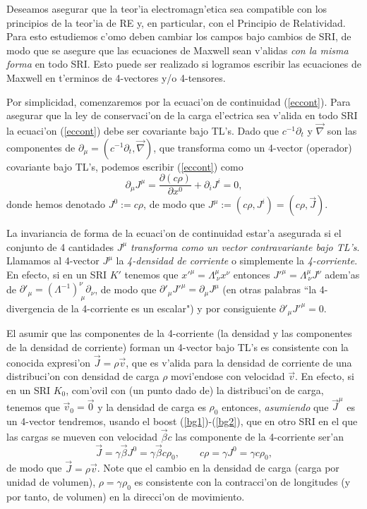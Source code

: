 Deseamos asegurar que la teor'ia electromagn'etica sea compatible con los
principios de la teor'ia de RE y, en particular, con el Principio de Relatividad. Para esto estudiemos c'omo deben cambiar los campos bajo cambios de SRI, de modo que se asegure que las ecuaciones de Maxwell sean v'alidas \textit{con la misma forma} en todo SRI. Esto puede ser realizado si logramos escribir las ecuaciones de Maxwell en t'erminos de 4-vectores y/o 4-tensores.

Por simplicidad, comenzaremos por la ecuaci'on de continuidad (\ref{eccont}). Para asegurar que la ley de conservaci'on de la carga el'ectrica sea v'alida en todo SRI la
ecuaci'on (\ref{eccont}) debe ser covariante bajo TL's.  Dado que
$c^{-1}\partial_t$ y $\vec{\nabla}$ son las componentes de
$\partial_\mu=(c^{-1}\partial_t, \vec\nabla)$, que transforma
como un 4-vector (operador) covariante bajo TL's, podemos escribir
(\ref{eccont}) como
\begin{equation}
\partial_\mu J^\mu=\frac{\partial(c \rho)}{\partial x^0} + \partial_i J^i =0
,\label{dj0}
\end{equation}
donde hemos denotado $J^0:=c \rho $, 
de modo que $J^\mu :=(c \rho,J^i)=(c \rho,\vec{J})$.

La invariancia de forma de la ecuaci'on de continuidad estar'a asegurada si el conjunto de 4 cantidades $J^\mu$ \textit{transforma como un vector contravariante bajo TL's}. Llamamos al 4-vector $J^\mu$ la \textit{4-densidad de corriente} o simplemente la \textit{4-corriente}. En efecto, si en un SRI $K'$ tenemos que $x'^\mu=\Lambda^\mu_{\ \nu}x^\nu$ entonces $J'^\mu=\Lambda^\mu_{\ \nu}J^\nu$ adem'as de $\partial'_\mu=(\Lambda^{-1})^\nu_{\  \mu}\partial_\nu$, de modo que $\partial'_\mu J'^\mu=\partial_\mu J^\mu$ (en otras palabras ``la 4-divergencia de la 4-corriente es un escalar") y por consiguiente $\partial'_\mu J'^\mu=0$.

El asumir que las componentes de la 4-corriente (la densidad y las componentes de la densidad de corriente) forman un 4-vector bajo TL's es consistente con la conocida expresi'on $\vec{J}=\rho\vec{v}$, que es v'alida para la densidad de corriente de una
distribuci'on con densidad de carga $\rho$ movi'endose con velocidad $\vec{v}$.
En efecto, si en un SRI $K_0$, com'ovil con (un punto dado de) la distribuci'on de carga, tenemos que $\vec{v}_0=\vec{0}$ y la densidad de carga es $\rho_0$ entonces, \textit{asumiendo} que $\vec{J}^\mu$ es un 4-vector tendremos, usando el boost (\ref{bg1})-(\ref{bg2}), que en otro SRI en el que las cargas se mueven con velocidad $\vec\beta c$ las componente de la 4-corriente ser'an
\begin{equation}
\vec{J}=\gamma\vec\beta J^0=\gamma\vec\beta c \rho_0, \qquad  c\rho=\gamma J^0=\gamma c
\rho_0,
\end{equation}
de modo que $\vec{J}=\rho\vec{v}$. Note que el cambio en la densidad de
carga (carga por unidad de volumen), $\rho=\gamma\rho_0$ es consistente con la contracci'on de longitudes (y por tanto, de volumen) en la direcci'on de movimiento.

